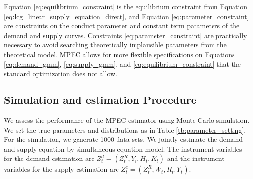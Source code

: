 \documentclass[11pt, a4paper]{article}
\begin{document}
Equation \eqref{eq:equilibrium_constraint} is the equilibrium constraint from Equation \eqref{eq:log_linear_supply_equation_direct}, and Equation \eqref{eq:parameter_constraint} are constraints on the conduct parameter and constant term parameters of the demand and supply curves. Constraints \eqref{eq:parameter_constraint} are practically necessary to avoid searching theoretically implausible parameters from the theoretical model. MPEC allows for more flexible specifications on Equations \eqref{eq:demand_gmm}, \eqref{eq:supply_gmm}, and \eqref{eq:equilibrium_constraint} that the standard optimization does not allow. 



\subsection{Simulation and estimation Procedure}

We assess the performance of the MPEC estimator using Monte Carlo simulation.
We set the true parameters and distributions as in Table \ref{tb:parameter_setting}. 
For the simulation, we generate 1000 data sets. We jointly estimate the demand and supply equation by simultaneous equation model.
The instrument variables for the demand estimation are $Z^{d}_{t} = (Z^{R}_{t}, Y_t, H_{t}, K_{t})$ and the instrument variables for the supply estimation are $Z^{c}_{t} = (Z^{R}_{t}, W_{t}, R_t, Y_t)$. 
\end{document}
